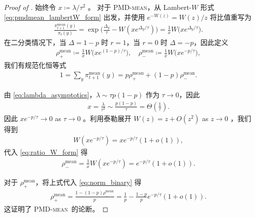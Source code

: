 \documentclass{article}
\theoremstyle{plain}
\theoremstyle{definition}
\theoremstyle{remark}
\newcommand{\cW}{W}
\begin{document}
\begin{proof}[Proof of ]
    始终令 $x\coloneqq\lambda/\tau^2$ 。
    对于 \textsc{PMD-mean}，从 Lambert-$W$ 形式 \eqref{eq:pmdmean_lambertW_form} 出发，并使用 $e^{-\cW(z)}=\cW(z)/z$ 将比值重写为
    \begin{align}\label{eq:ratio_W_form}
        \frac{\pi^{\mathrm{mean}}_{t+1}(y)}{\pi_t(y)}
        =\exp\Big(\frac{\Delta_y}{\tau}-\cW(xe^{\Delta_y/\tau})\Big)
        =\frac{1}{x}W\big(xe^{\Delta_y/\tau}\big).
    \end{align}
    在二分类情况下，当 $\Delta=1-p$ 时 $r=1$，当 $r=0$ 时 $\Delta=-p$，因此定义
    \begin{align*}
        \rho^{\mathrm{mean}}_+ \coloneqq \frac{1}{x}W\Big(xe^{(1-p)/\tau}\Big),
        \quad
        \rho^{\mathrm{mean}}_- \coloneqq \frac{1}{x}W\Big(xe^{-p/\tau}\Big),
    \end{align*}
    我们有规范化恒等式
    \begin{align}
        \label{eq:norm_binary}
        1=\sum_y\pi^{\mathrm{mean}}_{t+1}(y)=p\rho^{\mathrm{mean}}_+ + (1-p)\rho^{\mathrm{mean}}_-.
    \end{align}

    由 \eqref{eq:lambda_asymptotics}，$\lambda\sim \tau p(1-p)$ 作为 $\tau\to 0$，因此
    \begin{align*}
        x=\frac{\lambda}{\tau^2}\sim \frac{p(1-p)}{\tau}=\Theta\left(\frac{1}{\tau}\right).
    \end{align*}
    因此 $xe^{-p/\tau}\to 0$  as $\tau\to 0$ 。利用泰勒展开
    $\cW(z)=z+O(z^2)$  as $z\to 0$ ，我们得到
    \begin{align*}
        \cW(xe^{-p/\tau}) = xe^{-p/\tau}(1+o(1)),
    \end{align*}
    代入 \eqref{eq:ratio_W_form} 得
    \begin{align*}
        \rho^{\mathrm{mean}}_- = \frac{1}{x}\cW(xe^{-p/\tau}) = e^{-p/\tau}(1+o(1)).
    \end{align*}

    对于 $\rho^{\mathrm{mean}}_+$，将上式代入 \eqref{eq:norm_binary} 得
    \begin{align*}
        \rho^{\mathrm{mean}}_+
        =\frac{1-(1-p)\rho^{\mathrm{mean}}_-}{p}
        =\frac{1}{p}-\frac{1-p}{p}e^{-p/\tau}(1+o(1)).
    \end{align*}
    这证明了 \textsc{PMD-mean}\ 的论断。



\end{proof}
\end{document}
